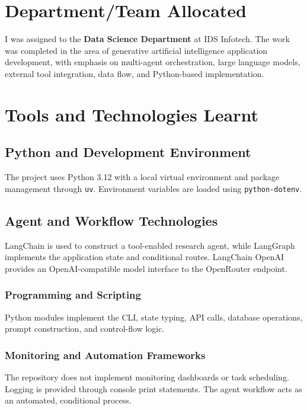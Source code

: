 \documentclass[12pt,a4paper]{report}
\begin{document}
\section{Department/Team Allocated}
\label{sec:department-team}
I was assigned to the \textbf{Data Science Department} at IDS Infotech. The work was completed
in the area of generative artificial intelligence application development, with emphasis on
multi-agent orchestration, large language models, external tool integration, data flow, and
Python-based implementation.

\section{Tools and Technologies Learnt}
\label{sec:tools-technologies}

\subsection{Python and Development Environment}
\label{subsec:python-development}
The project uses Python 3.12 with a local virtual environment and package management through
\texttt{uv}. Environment variables are loaded using \texttt{python-dotenv}.

\subsection{Agent and Workflow Technologies}
\label{subsec:agent-workflow-technologies}
LangChain is used to construct a tool-enabled research agent, while LangGraph implements the
application state and conditional routes. LangChain OpenAI provides an OpenAI-compatible model
interface to the OpenRouter endpoint.

\subsubsection{Programming and Scripting}
Python modules implement the CLI, state typing, API calls, database operations, prompt construction,
and control-flow logic.

\subsubsection{Monitoring and Automation Frameworks}
The repository does not implement monitoring dashboards or task scheduling. Logging is provided
through console print statements. The agent workflow acts as an automated, conditional process.
\end{document}

